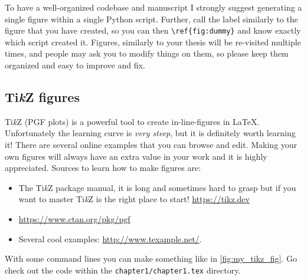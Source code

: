 To have a well-organized codebase and manuscript I strongly suggest generating a single figure within a single Python script. Further, call the label similarly to the figure that you have created, so you can then \verb|\ref{fig:dummy}| and know exactly which script created it. Figures, similarly to your thesis will be re-visited multiple times, and people may ask you to modify things on them, so please keep them organized and easy to improve and fix.

\subsection{Ti\textit{k}Z figures}
\label{sec:tikz}

Ti\textit{k}Z  (PGF plots) is a powerful tool to create in-line-figures in \LaTeX. Unfortunately the learning curve is \textit{very steep}, but it is definitely worth learning it! There are several online examples that you can browse and edit. Making your own figures will always have an extra value in your work and it is highly appreciated. Sources to learn how to make figures are:
\begin{itemize}
    \item The Ti\textit{k}Z package manual, it is long and sometimes hard to grasp but if you want to master Ti\textit{k}Z is the right place to start! \url{https://tikz.dev}
    \item \url{https://www.ctan.org/pkg/pgf}
    \item Several cool examples: \url{http://www.texample.net/}.
\end{itemize}
With some command lines you can make something like in \cref{fig:my_tikz_fig}. Go check out the code within the \texttt{chapter1/chapter1.tex} directory.

